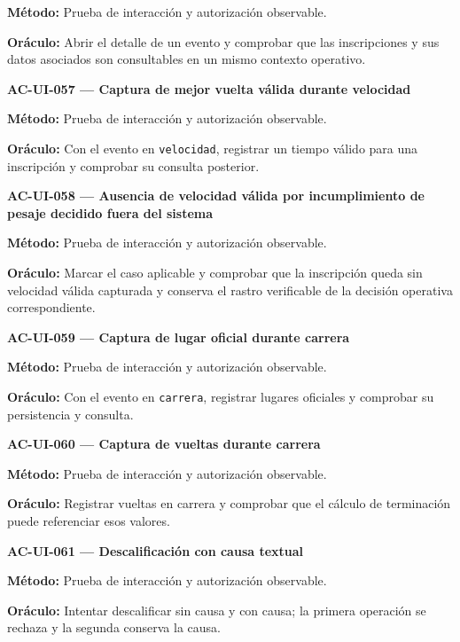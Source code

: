 \documentclass[10pt,letterpaper]{article}
\begin{document}
\textbf{Método:} Prueba de interacción y autorización observable.\par
\textbf{Oráculo:} Abrir el detalle de un evento y comprobar que las inscripciones y sus datos asociados son consultables en un mismo contexto operativo.\par\vspace{0.45em}
\noindent\textbf{AC-UI-057 --- Captura de mejor vuelta válida durante velocidad}\par
\textbf{Método:} Prueba de interacción y autorización observable.\par
\textbf{Oráculo:} Con el evento en \texttt{velocidad}, registrar un tiempo válido para una inscripción y comprobar su consulta posterior.\par\vspace{0.45em}
\noindent\textbf{AC-UI-058 --- Ausencia de velocidad válida por incumplimiento de pesaje decidido fuera del sistema}\par
\textbf{Método:} Prueba de interacción y autorización observable.\par
\textbf{Oráculo:} Marcar el caso aplicable y comprobar que la inscripción queda sin velocidad válida capturada y conserva el rastro verificable de la decisión operativa correspondiente.\par\vspace{0.45em}
\noindent\textbf{AC-UI-059 --- Captura de lugar oficial durante carrera}\par
\textbf{Método:} Prueba de interacción y autorización observable.\par
\textbf{Oráculo:} Con el evento en \texttt{carrera}, registrar lugares oficiales y comprobar su persistencia y consulta.\par\vspace{0.45em}
\noindent\textbf{AC-UI-060 --- Captura de vueltas durante carrera}\par
\textbf{Método:} Prueba de interacción y autorización observable.\par
\textbf{Oráculo:} Registrar vueltas en carrera y comprobar que el cálculo de terminación puede referenciar esos valores.\par\vspace{0.45em}
\noindent\textbf{AC-UI-061 --- Descalificación con causa textual}\par
\textbf{Método:} Prueba de interacción y autorización observable.\par
\textbf{Oráculo:} Intentar descalificar sin causa y con causa; la primera operación se rechaza y la segunda conserva la causa.\par\vspace{0.45em}
\end{document}
